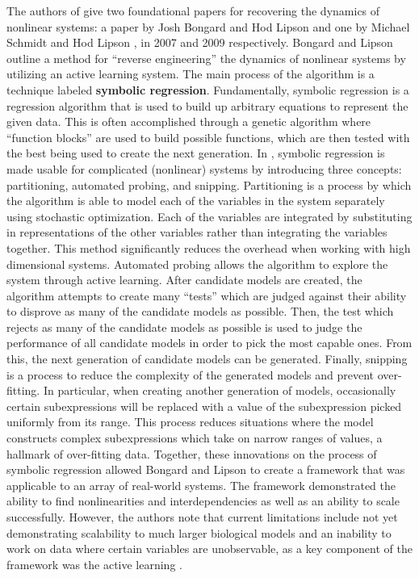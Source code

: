 \documentclass[10pt]{paper}
\begin{document}
The authors of \cite{sindy} give two foundational papers for recovering the dynamics of nonlinear systems: a paper by Josh Bongard and Hod Lipson \cite{bongard} and one by Michael Schmidt and Hod Lipson \cite{schmidt}, in 2007 and 2009 respectively.
Bongard and Lipson \cite{bongard} outline a method for ``reverse engineering'' the dynamics of nonlinear systems by utilizing an active learning system. 
The main process of the algorithm is a technique labeled \textbf{symbolic regression}. Fundamentally, symbolic regression is a regression algorithm that is used to build up arbitrary equations to represent the given data. This is often accomplished through a genetic algorithm where ``function blocks'' are used to build possible functions, which are then tested with the best being used to create the next generation.
In \cite{bongard}, symbolic regression is made usable for complicated (nonlinear) systems by introducing three concepts: partitioning, automated probing, and snipping. Partitioning is a process by which the algorithm is able to model each of the variables in the system separately using stochastic optimization. 
Each of the variables are integrated by substituting in representations of the other variables rather than integrating the variables together. This method significantly reduces the overhead when working with high dimensional systems. Automated probing allows the algorithm to explore the system through active learning. After candidate models are created, the algorithm attempts to create many ``tests'' which are judged against their ability to disprove as many of the candidate models as possible. Then, the test which rejects as many of the candidate models as possible is used to judge the performance of all candidate models in order to pick the most capable ones. From this, the next generation of candidate models can be generated. 
Finally, snipping is a process to reduce the complexity of the generated models and prevent over-fitting. In particular, when creating another generation of models, occasionally certain subexpressions will be replaced with a value of the subexpression picked uniformly from its range. 
This process reduces situations where the model constructs complex subexpressions which take on narrow ranges of values, a hallmark of over-fitting data.
Together, these innovations on the process of symbolic regression allowed Bongard and Lipson to create a framework that was applicable to an array of real-world systems. The framework demonstrated the ability to find nonlinearities and interdependencies as well as an ability to scale successfully. However, the authors note that current limitations include not yet demonstrating scalability to much larger biological models and an inability to work on data where certain variables are unobservable, as a key component of the framework was the active learning \cite{bongard}. 
\end{document}
